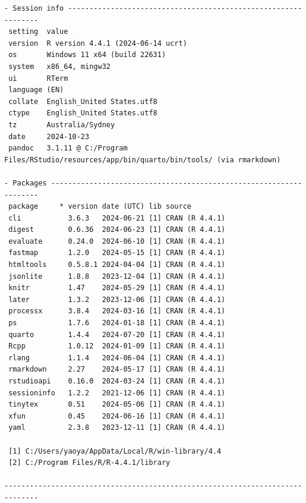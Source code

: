 \documentclass[
  a4paper,
  oneside,
  openany,
  12pt,
  onecolumn]{book}
\theoremstyle{definition}
\theoremstyle{definition}
\theoremstyle{plain}
\theoremstyle{remark}
\begin{document}
\begin{verbatim}
- Session info ---------------------------------------------------------------
 setting  value
 version  R version 4.4.1 (2024-06-14 ucrt)
 os       Windows 11 x64 (build 22631)
 system   x86_64, mingw32
 ui       RTerm
 language (EN)
 collate  English_United States.utf8
 ctype    English_United States.utf8
 tz       Australia/Sydney
 date     2024-10-23
 pandoc   3.1.11 @ C:/Program Files/RStudio/resources/app/bin/quarto/bin/tools/ (via rmarkdown)

- Packages -------------------------------------------------------------------
 package     * version date (UTC) lib source
 cli           3.6.3   2024-06-21 [1] CRAN (R 4.4.1)
 digest        0.6.36  2024-06-23 [1] CRAN (R 4.4.1)
 evaluate      0.24.0  2024-06-10 [1] CRAN (R 4.4.1)
 fastmap       1.2.0   2024-05-15 [1] CRAN (R 4.4.1)
 htmltools     0.5.8.1 2024-04-04 [1] CRAN (R 4.4.1)
 jsonlite      1.8.8   2023-12-04 [1] CRAN (R 4.4.1)
 knitr         1.47    2024-05-29 [1] CRAN (R 4.4.1)
 later         1.3.2   2023-12-06 [1] CRAN (R 4.4.1)
 processx      3.8.4   2024-03-16 [1] CRAN (R 4.4.1)
 ps            1.7.6   2024-01-18 [1] CRAN (R 4.4.1)
 quarto        1.4.4   2024-07-20 [1] CRAN (R 4.4.1)
 Rcpp          1.0.12  2024-01-09 [1] CRAN (R 4.4.1)
 rlang         1.1.4   2024-06-04 [1] CRAN (R 4.4.1)
 rmarkdown     2.27    2024-05-17 [1] CRAN (R 4.4.1)
 rstudioapi    0.16.0  2024-03-24 [1] CRAN (R 4.4.1)
 sessioninfo   1.2.2   2021-12-06 [1] CRAN (R 4.4.1)
 tinytex       0.51    2024-05-06 [1] CRAN (R 4.4.1)
 xfun          0.45    2024-06-16 [1] CRAN (R 4.4.1)
 yaml          2.3.8   2023-12-11 [1] CRAN (R 4.4.1)

 [1] C:/Users/yaoya/AppData/Local/R/win-library/4.4
 [2] C:/Program Files/R/R-4.4.1/library

------------------------------------------------------------------------------
\end{verbatim}


\backmatter
\end{document}

